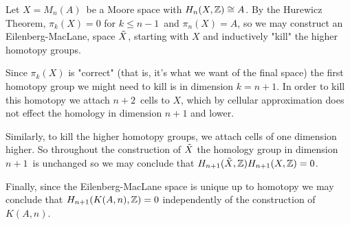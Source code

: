 \documentclass[a4paper,11pt,english]{article}
\begin{document}
\begin{exercise}[3]

Let $X = M_n(A)$ be a Moore space with $H_n(X,\mathbb{Z}) \cong A$. 
By the Hurewicz Theorem, $\pi_k(X) = 0$ for $k \le n-1$ and $\pi_n(X) = A$, so 
we may construct an Eilenberg-MacLane, space $\tilde X$, starting with $X$ and
inductively "kill" the higher homotopy groups. 

Since $\pi_k(X)$ is "correct" (that is, it's what we want of the final space) 
the first homotopy group we might need to kill is in dimension $k=n+1$. 
In order to kill this homotopy we attach $n+2$ cells to $X$, which by cellular
approximation does not effect the homology in dimension $n+1$ and lower.

Similarly, to kill the higher homotopy groups, we attach cells of one dimension
higher. So throughout the construction of $\tilde X$ the homology group in dimension
$n+1$ is unchanged so we may conclude that $H_{n+1}(\tilde X, \mathbb{Z}) H_{n+1}(X, \mathbb{Z}) = 0$. 

Finally, since the Eilenberg-MacLane space is unique up to homotopy we may
conclude that $H_{n+1}(K(A,n),\mathbb{Z}) = 0$ independently of the construction of
$K(A,n)$.

\end{exercise}
\end{document}
